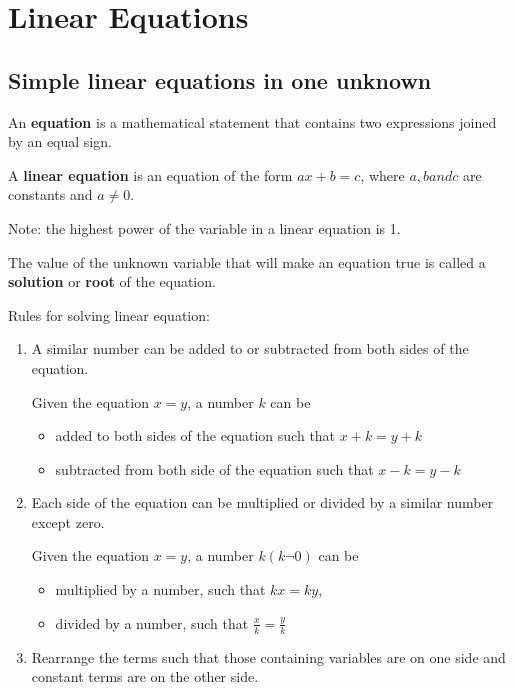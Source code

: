 \documentclass[../main]{subfiles}
\begin{document}
\section{Linear Equations}

\subsection{Simple linear equations in one unknown}
An \textbf{equation} is a mathematical statement that contains two expressions
joined by an equal sign.

A \textbf{linear equation} is an equation of the form \(ax + b=c\), where \(a, b
and c\) are constants and \(a \neq 0\).

Note: the highest power of the variable in a linear equation is 1.


The value of the unknown variable that will make an equation true is called a
\textbf{solution} or \textbf{root} of the equation.

Rules for solving linear equation:
\begin{enumerate}
\item  A similar number can be added to or subtracted from both sides of the
  equation.

  Given the equation \(x =y\), a number \(k\) can be 
  \begin{itemize}
  \item  added to both sides of the equation such that \(x + k = y + k\)
  \item subtracted from both side of the equation such that \(x - k = y -k\)
  \end{itemize}

 
\item Each side of the equation can be multiplied or divided by a similar number
  except zero.
  
  Given the equation \(x =y\), a number \(k(k \neg 0)\) can be 
  \begin{itemize}
  \item multiplied by a number, such that \(kx = ky\),
  \item  divided by a number, such that \({\frac x k }= {\frac y k}\)
  \end{itemize}

 
\item  Rearrange the terms such that those containing variables are on one side
  and constant terms are on the other side.
  
\end{enumerate}
\end{document}
